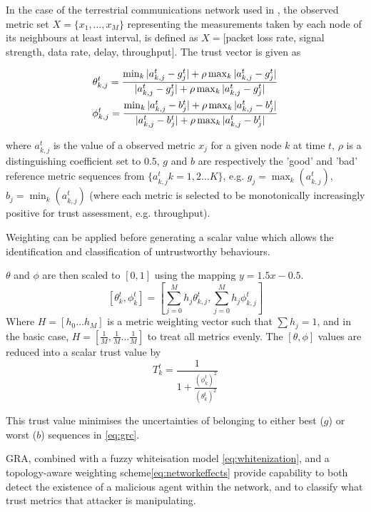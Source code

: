 \documentclass[runningheads,a4paper]{llncs}
\begin{document}
In the case of the terrestrial communications network used in \cite{Guo2012}, the observed metric set $X = \{x_1,\dots,x_M\}$ representing the measurements taken by each node of its neighbours at least interval, is defined as $X=[$packet loss rate, signal strength, data rate, delay, throughput$]$.
The trust vector is given as

\begin{align}
  \label{eq:grc}
  \theta_{k,j}^t = \frac{\min_k|a_{k,j}^t - g_j^t| + \rho \max_k|a_{k,j}^t-g_j^t|}{|a_{k,j}^t-g_j^t| + \rho \max_k|a_{k,j}^t-g_j^t|} \\
  \phi_{k,j}^t = \frac{\min_k|a_{k,j}^t - b_j^t| + \rho \max_k|a_{k,j}^t-b_j^t|}{|a_{k,j}^t-b_j^t| + \rho \max_k|a_{k,j}^t-b_j^t|} \notag 
\end{align}

where $a_{k,j}^t$ is the value of a observed metric $x_j$ for a given node $k$ at time $t$, $\rho$ is a distinguishing coefficient set to $0.5$, $g$ and $b$ are respectively the 'good' and 'bad' reference metric sequences from $\{a_{k,j}^t k=1,2\dots K\}$, e.g. $g_j=\max_k({a_{k,j}^t})$,  $b_j=\min_k({a_{k,j}^t})$ (where each metric is selected to be monotonically increasingly positive for trust assessment, e.g. throughput). 

Weighting can be applied before generating a scalar value which allows the identification and classification of untrustworthy behaviours.

$\theta$ and $\phi$ are then scaled to $[0,1]$ using the mapping $y = 1.5 x - 0.5$.
\begin{equation}
  \label{eq:metric_weighting}
  [\theta_k^t, \phi_k^t] = \left[\sum_{j=0}^M h_j \theta_{k,j}^t,\sum_{j=0}^M h_j \phi_{k,j}^t \right]
\end{equation}
Where $H=[h_0\dots h_M]$ is a metric weighting vector such that $\sum h_j = 1$, and in the basic case, $H=[\frac{1}{M},\frac{1}{M}\dots\frac{1}{M}]$ to treat all metrics evenly.
The $[\theta,\phi]$ values are reduced into a scalar trust value by
\begin{equation}
  \label{eq:trustvalue}
  T_k^t = \frac{1}{1+\frac{(\phi_k^t)^2}{(\theta_k^t)^2}}
\end{equation}

This trust value minimises the uncertainties of belonging to either best ($g$) or worst ($b$) sequences in \eqref{eq:grc}.

GRA, combined with a fuzzy whiteisation model \eqref{eq:whitenization}, and a topology-aware weighting scheme\eqref{eq:networkeffects} provide capability to both detect the existence of a malicious agent within the network, and to classify what trust metrics that attacker is manipulating.
\end{document}
